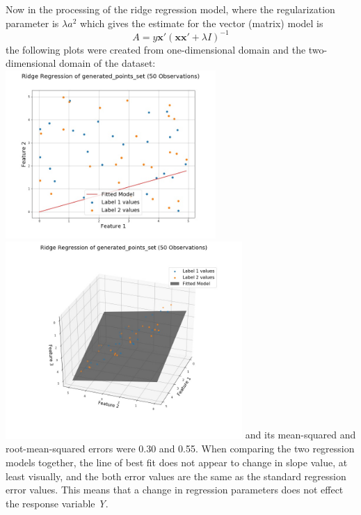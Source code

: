 \documentclass[a4paper,12pt]{IEEEtran}
\begin{document}
Now in the processing of the ridge regression model, where the regularization parameter is $\lambda \textit{a}^{2}$ which gives the estimate for the vector (matrix) model is
$$\textit{A} = \textit{y}\textbf{x}'(\textbf{x}\textbf{x}' + \lambda \textit{I})^{-1}$$the following plots were created from one-dimensional domain and the two-dimensional domain of the dataset: \includegraphics[width=8cm]{ridge_reg_1d_generated_points_set} \includegraphics[width=9cm]{ridge_reg_2d_generated_points_set} and its mean-squared and root-mean-squared errors were 0.30 and 0.55. When comparing the two regression models together, the line of best fit does not appear to change in slope value, at least visually, and the both error values are the same as the standard regression error values. This means that a change in regression parameters does not effect the response variable \textit{Y}.
\end{document}
